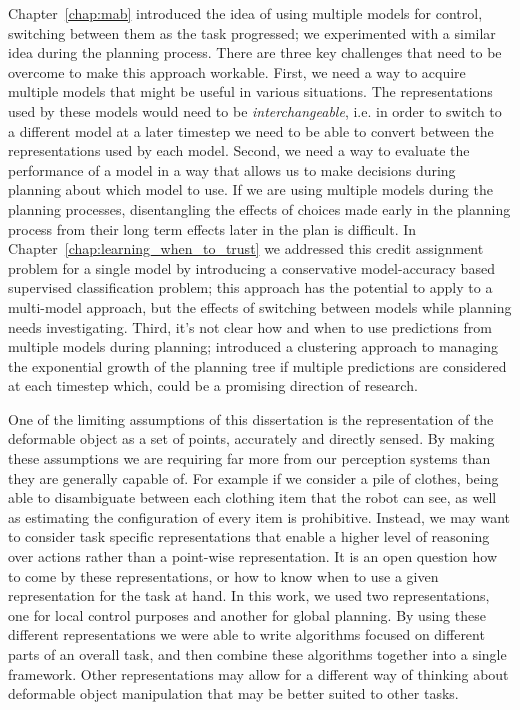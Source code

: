 Chapter~\ref{chap:mab} introduced the idea of using multiple models for control, switching between them as the task progressed; we experimented with a similar idea during the planning process. There are three key challenges that need to be overcome to make this approach workable. First, we need a way to acquire multiple models that might be useful in various situations. The representations used by these models would need to be \textit{interchangeable}, i.e. in order to switch to a different model at a later timestep we need to be able to convert between the representations used by each model. Second, we need a way to evaluate the performance of a model in a way that allows us to make decisions during planning about which model to use. If we are using multiple models during the planning processes, disentangling the effects of choices made early in the planning process from their long term effects later in the plan is difficult. In Chapter~\ref{chap:learning_when_to_trust} we addressed this credit assignment problem for a single model by introducing a conservative model-accuracy based supervised classification problem; this approach has the potential to apply to a multi-model approach, but the effects of switching between models while planning needs investigating. Third, it's not clear how and when to use predictions from multiple models during planning; \citet{calderWAFR} introduced a clustering approach to managing the exponential growth of the planning tree if multiple predictions are considered at each timestep which, could be a promising direction of research.

One of the limiting assumptions of this dissertation is the representation of the deformable object as a set of points, accurately and directly sensed. By making these assumptions we are requiring far more from our perception systems than they are generally capable of. For example if we consider a pile of clothes, being able to disambiguate between each clothing item that the robot can see, as well as estimating the configuration of every item is prohibitive. Instead, we may want to consider task specific representations that enable a higher level of reasoning over actions rather than a point-wise representation. It is an open question how to come by these representations, or how to know when to use a given representation for the task at hand. In this work, we used two representations, one for local control purposes and another for global planning. By using these different representations we were able to write algorithms focused on different parts of an overall task, and then combine these algorithms together into a single framework. Other representations may allow for a different way of thinking about deformable object manipulation that may be better suited to other tasks.

